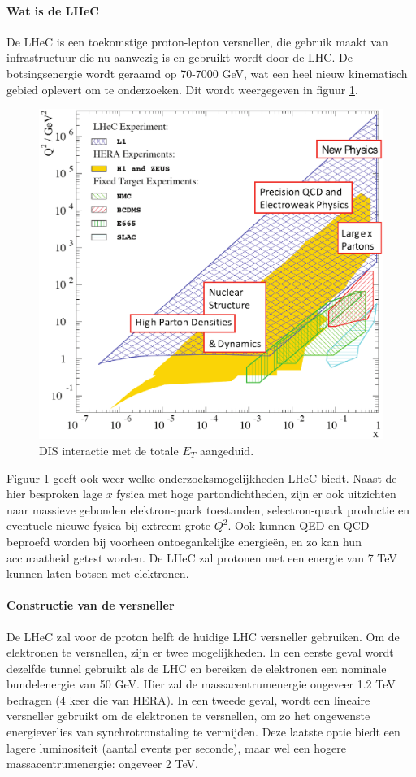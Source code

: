 \documentclass[a4paper,11pt]{article}
\numberwithin{equation}{section} %
\begin{document}
      \paragraph{Wat is de LHeC}
De LHeC is een toekomstige proton-lepton versneller, die gebruik maakt van infrastructuur die nu aanwezig is en gebruikt wordt door de LHC.
De botsingsenergie wordt geraamd op 70-7000 GeV, wat een heel nieuw kinematisch gebied oplevert om te onderzoeken.
Dit wordt weergegeven in figuur \ref{fig:LHeCKinematicRegion}.
\begin{figure} [H]
  \begin{center}
    \includegraphics[width=.66\textwidth]{Afbeeldingen/LHeCKinematicRegion.eps}
    \caption{DIS interactie met de totale $E_T$ aangeduid. \cite{ET}}
   \label{fig:LHeCKinematicRegion}
  \end{center}
\end{figure}
Figuur \ref{fig:LHeCKinematicRegion} geeft ook weer welke onderzoeksmogelijkheden LHeC biedt.
Naast de hier besproken lage $x$ fysica met hoge partondichtheden, zijn er ook uitzichten naar massieve gebonden elektron-quark toestanden, selectron-quark productie en eventuele nieuwe fysica bij extreem grote $Q^2$.
Ook kunnen QED en QCD beproefd worden bij voorheen ontoegankelijke energieën, en zo kan hun accuraatheid getest worden.
De LHeC zal protonen met een energie van 7 TeV kunnen laten botsen met elektronen.

      \paragraph{Constructie van de  versneller}
De LHeC zal voor de proton helft de huidige LHC versneller gebruiken.
Om de elektronen te versnellen, zijn er twee mogelijkheden.
In een eerste geval wordt dezelfde tunnel gebruikt als de LHC en bereiken de elektronen een nominale bundelenergie van 50 GeV.
Hier zal de massacentrumenergie ongeveer 1.2 TeV bedragen (4 keer die van HERA).
In een tweede geval, wordt een lineaire versneller gebruikt om de elektronen te versnellen, om zo het ongewenste energieverlies van synchrotronstaling te vermijden.
Deze laatste optie biedt een lagere luminositeit (aantal events per seconde), maar wel een hogere massacentrumenergie: ongeveer 2 TeV.
\end{document}
